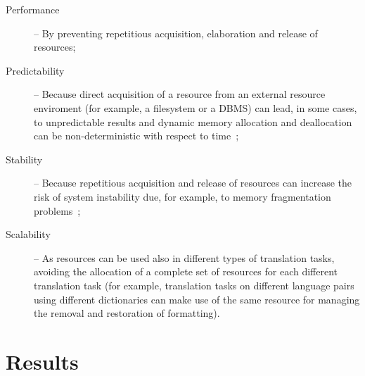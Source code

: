 \documentclass[11pt]{article}
\begin{document}
\begin{description}

 \item[Performance] -- By preventing repetitious acquisition, elaboration and release of resources;

 \item[Predictability] -- Because direct acquisition of a resource from an external resource enviroment (for example, a filesystem or a DBMS) can lead, in some cases, to unpredictable results and dynamic memory allocation and deallocation can be non-deterministic with respect to time~\citep{realtime};

 \item[Stability] -- Because repetitious acquisition and release of resources can increase the risk of system instability due, for example, to memory fragmentation problems~\citep{robust, realtime};  %





 \item[Scalability] -- As resources can be used also in different types of translation tasks, avoiding the allocation of a complete set of resources for each different translation task (for example, translation tasks on different language pairs using different dictionaries can make use of the same resource for managing the removal and restoration of formatting).

\end{description}

\section{Results}
\end{document}

